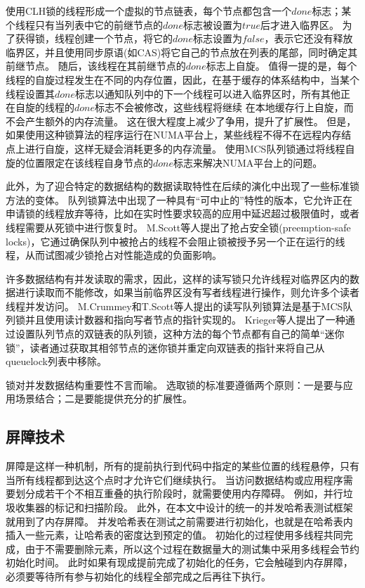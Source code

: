 使用CLH锁的线程形成一个虚拟的节点链表，每个节点都包含一个$done$标志；某个线程只有当列表中它的前继节点的$done$标志被设置为$true$后才进入临界区。
为了获得锁，线程创建一个节点，将它的$done$标志设置为$false$，表示它还没有释放临界区，并且使用同步原语(如CAS)将它自己的节点放在列表的尾部，同时确定其前继节点。
随后，该线程在其前继节点的$done$标志上自旋。
值得一提的是，每个线程的自旋过程发生在不同的内存位置，因此，在基于缓存的体系结构中，当某个线程设置其$done$标志以通知队列中的下一个线程可以进入临界区时，所有其他正在自旋的线程的$done$标志不会被修改，这些线程将继续 在本地缓存行上自旋，而不会产生额外的内存流量。
这在很大程度上减少了争用，提升了扩展性。
但是，如果使用这种锁算法的程序运行在NUMA平台上，某些线程不得不在远程内存结点上进行自旋，这样无疑会消耗更多的内存流量。
使用MCS队列锁\cite{mellor1991algorithms}通过将线程自旋的位置限定在该线程自身节点的$done$标志来解决NUMA平台上的问题。

此外，为了迎合特定的数据结构的数据读取特性在后续的演化中出现了一些标准锁方法的变体。
队列锁算法中出现了一种具有“可中止的”特性的版本，它允许正在申请锁的线程放弃等待，比如在实时性要求较高的应用中延迟超过极限值时\cite{scott2002non,scott2001scalable}，或者线程需要从死锁中进行恢复时。
M.Scott等人提出了抢占安全锁(preemption-safe locks)\cite{michael1998nonblocking}，它通过确保队列中被抢占的线程不会阻止锁被授予另一个正在运行的线程，从而试图减少锁抢占对性能造成的负面影响。

许多数据结构有并发读取的需求，因此，这样的读写锁只允许线程对临界区内的数据进行读取而不能修改，如果当前临界区没有写者线程进行操作，则允许多个读者线程并发访问。
M.Crummey和T.Scott等人提出的读写队列锁算法是基于MCS队列锁并且使用读计数器和指向写者节点的指针实现的\cite{mellor1991scalable}。
Krieger等人\cite{krieger1993fair}提出了一种通过设置队列节点的双链表的队列锁，这种方法的每个节点都有自己的简单“迷你锁”，读者通过获取其相邻节点的迷你锁并重定向双链表的指针来将自己从queuelock列表中移除。

锁对并发数据结构重要性不言而喻。
选取锁的标准要遵循两个原则：一是要与应用场景结合；二是要能提供充分的扩展性。

\subsection{屏障技术}

屏障是这样一种机制，所有的提前执行到代码中指定的某些位置的线程悬停，只有当所有线程都到达这个点时才允许它们继续执行。 当访问数据结构或应用程序需要划分成若干个不相互重叠的执行阶段时，就需要使用内存障碍。
例如，并行垃圾收集器的标记和扫描阶段。
此外，在本文中设计的统一的并发哈希表测试框架就用到了内存屏障。
并发哈希表在测试之前需要进行初始化，也就是在哈希表内插入一些元素，让哈希表的密度达到预定的值。
初始化的过程使用多线程共同完成，由于不需要删除元素，所以这个过程在数据量大的测试集中采用多线程会节约初始化时间。
此时如果有现成提前完成了初始化的任务，它会触碰到内存屏障，必须要等待所有参与初始化的线程全部完成之后再往下执行。

